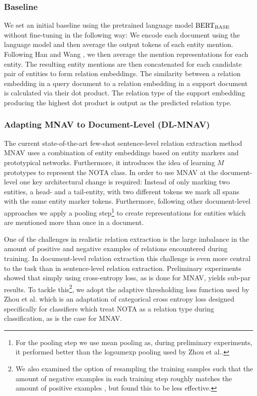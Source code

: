 \documentclass[11pt]{article}
\begin{document}
\subsubsection{Baseline}
\label{subsection:baseline}
We set an initial baseline using the pretrained language model ${\textnormal{BERT}}_{\textnormal{BASE}}$ \cite{devlin_bert_2019} without fine-tuning in the following way: We encode each document using the language model and then average the output tokens of each entity mention. Following Han and Wang \cite{han_novel_2020}, we then average the mention representations for each entity. The resulting entity mentions are then concatenated for each candidate pair of entities to form relation embeddings. The similarity between a relation embedding in a query document to a relation embedding in a support document is calculated via their dot product. The relation type of the support embedding producing the highest dot product is output as the predicted relation type.


\subsubsection{Adapting MNAV to Document-Level (DL-MNAV)}
The current state-of-the-art few-shot sentence-level relation extraction method MNAV \cite{sabo_revisiting_2021} uses a combination of entity embeddings based on entity markers and prototypical networks.
Furthermore, it introduces the idea of learning $M$ prototypes to represent the NOTA class.
In order to use MNAV at the document-level one key architectural change is required: 
Instead of only marking two entities, a head- and a tail-entity, with two different tokens we mark all spans with the same entity marker tokens. 
Furthermore, following other document-level approaches \cite{han_novel_2020, zhou_document-level_2020} we apply a pooling step\footnote{For the pooling step we use mean pooling as, during preliminary experiments, it performed better than the logsumexp pooling used by Zhou et al..} to create representations for entities which are mentioned more than once in a document.

One of the challenges in realistic relation extraction is the large imbalance in the amount of positive and negative examples of relations encountered during training. 
In document-level relation extraction this challenge is even more central to the task than in sentence-level relation extraction. 
Preliminary experiments showed that simply using cross-entropy loss, as is done for MNAV, yields sub-par results.
To tackle this\footnote{We also examined the option of resampling the training samples such that the amount of negative examples in each training step roughly matches the amount of positive examples \cite{han_novel_2020}, but found this to be less effective.}, we adopt the adaptive thresholding loss function used by Zhou et al. \cite{zhou_document-level_2020} which is an adaptation of categorical cross entropy loss designed specifically for classifiers which treat NOTA as a relation type during classification, as is the case for MNAV.
\end{document}
